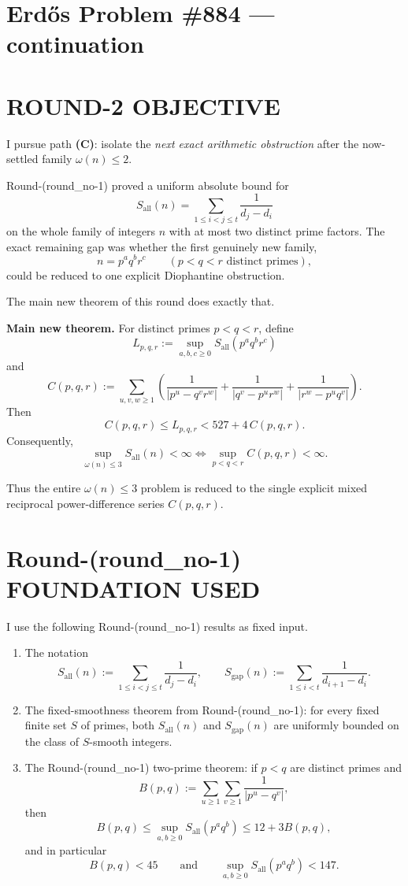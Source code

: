 \section{Erd\H{o}s Problem \#884 --- continuation}

\section{ROUND-2 OBJECTIVE}

I pursue path \textbf{(C)}: isolate the \emph{next exact arithmetic obstruction} after the now-settled family \(\omega(n)\le 2\).

Round-(round\_no-1) proved a uniform absolute bound for
\[
S_{\mathrm{all}}(n)=\sum_{1\le i<j\le t}\frac1{d_j-d_i}
\]
on the whole family of integers \(n\) with at most two distinct prime factors. The exact remaining gap was whether the first genuinely new family,
\[
n=p^a q^b r^c \qquad (p<q<r\text{ distinct primes}),
\]
could be reduced to one explicit Diophantine obstruction.

The main new theorem of this round does exactly that.

\medskip

\noindent\textbf{Main new theorem.}
For distinct primes \(p<q<r\), define
\[
L_{p,q,r}:=\sup_{a,b,c\ge 0} S_{\mathrm{all}}(p^a q^b r^c)
\]
and
\[
C(p,q,r):=\sum_{u,v,w\ge 1}
\left(
\frac{1}{|p^u-q^v r^w|}
+\frac{1}{|q^v-p^u r^w|}
+\frac{1}{|r^w-p^u q^v|}
\right).
\]
Then
\[
C(p,q,r)\le L_{p,q,r}<527+4\,C(p,q,r).
\]
Consequently,
\[
\sup_{\omega(n)\le 3} S_{\mathrm{all}}(n)<\infty
\iff
\sup_{p<q<r} C(p,q,r)<\infty.
\]

Thus the entire \(\omega(n)\le 3\) problem is reduced to the single explicit mixed reciprocal power-difference series \(C(p,q,r)\).

\section{Round-(round\_no-1) FOUNDATION USED}

I use the following Round-(round\_no-1) results as fixed input.

\begin{enumerate}
\item The notation
\[
S_{\mathrm{all}}(n):=\sum_{1\le i<j\le t}\frac{1}{d_j-d_i},
\qquad
S_{\mathrm{gap}}(n):=\sum_{1\le i<t}\frac{1}{d_{i+1}-d_i}.
\]

\item The fixed-smoothness theorem from Round-(round\_no-1): for every fixed finite set \(S\) of primes, both \(S_{\mathrm{all}}(n)\) and \(S_{\mathrm{gap}}(n)\) are uniformly bounded on the class of \(S\)-smooth integers.

\item The Round-(round\_no-1) two-prime theorem: if \(p<q\) are distinct primes and
\[
B(p,q):=\sum_{u\ge 1}\sum_{v\ge 1}\frac{1}{|p^u-q^v|},
\]
then
\[
B(p,q)\le \sup_{a,b\ge 0}S_{\mathrm{all}}(p^a q^b)\le 12+3B(p,q),
\]
and in particular
\[
B(p,q)<45
\qquad\text{and}\qquad
\sup_{a,b\ge 0}S_{\mathrm{all}}(p^a q^b)<147.
\]
\end{enumerate}

